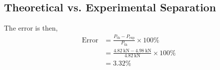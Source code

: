 \subsection{Theoretical vs. Experimental Separation}
The error is then,
\begin{align*}
    \text{Error} &= \frac{P_{\text{th}} - P_{\text{exp}}}{P_{\text{th}}} \times 100\% \\
    &= \frac{\qty{4.82}{\kilo\newton} - \qty{4.98}{\kilo\newton}}{\qty{4.82}{\kilo\newton}} \times 100\% \\
    &= \boxed{3.32\%}
\end{align*}
